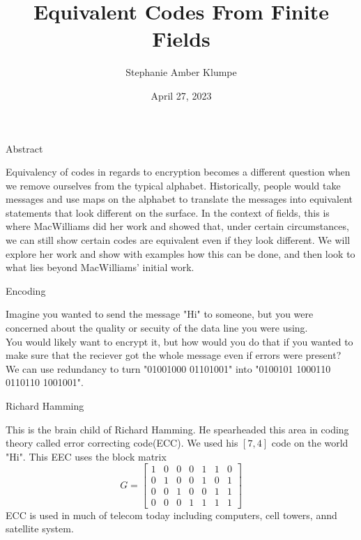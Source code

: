 \documentclass{beamer}
\title{Equivalent Codes From Finite Fields}
\author{Stephanie Amber Klumpe}
\institute{University of Colorado at Colorado Springs}
\date{April 27, 2023}
\begin{document}
\begin{frame}
    \titlepage
\end{frame}

\begin{frame}{Abstract}
    
    Equivalency of codes in regards to encryption becomes a different question when we remove ourselves from
    the typical alphabet. Historically, people would take messages and use maps on the alphabet to translate
    the messages into equivalent statements that look different on the surface. In the context of fields,
    this is where MacWilliams did her work and showed that, under certain circumstances, we can still show
    certain codes are equivalent even if they look different. We will explore her work and show with
    examples how this can be done, and then look to what lies beyond MacWilliams' initial work.

\end{frame}

\begin{frame}{Encoding}
    
    Imagine you wanted to send the message "Hi" to someone, but you were concerned about the quality
    or secuity of the data line you were using.\\
    You would likely want to encrypt it, but how would you do that if you wanted to make sure that the
    reciever got the whole message even if errors were present?\\
    We can use redundancy to turn "01001000 01101001" into "0100101 1000110 0110110 1001001".

\end{frame}

\begin{frame}{Richard Hamming}
    
    This is the brain child of Richard Hamming. He spearheaded this area in coding theory called error
    correcting code(ECC). We used his $[7,4]$ code on the world "Hi". This EEC uses the block matrix
    $$G=\left[\begin{array}{ccccccc}
        1 & 0 & 0 & 0 & 1 & 1 & 0 \\
        0 & 1 & 0 & 0 & 1 & 0 & 1 \\
        0 & 0 & 1 & 0 & 0 & 1 & 1 \\
        0 & 0 & 0 & 1 & 1 & 1 & 1
    \end{array}\right]$$
    ECC is used in much of telecom today including computers, cell towers, annd satellite system.\\\

\end{frame}
\end{document}
